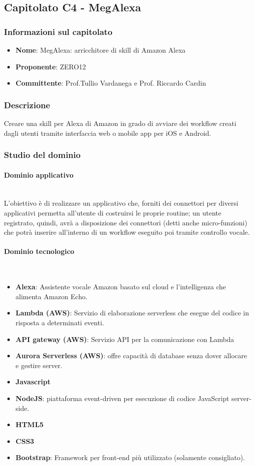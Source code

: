 \subsection{Capitolato C4 - MegAlexa}
\subsubsection{Informazioni sul capitolato}
\begin{itemize}
    \item \textbf{Nome}: MegAlexa: arricchitore di skill di Amazon Alexa
	\item \textbf{Proponente}: ZERO12
	\item \textbf{Committente}: Prof.Tullio Vardanega e Prof. Riccardo Cardin
\end{itemize}
\subsubsection{Descrizione}
Creare una skill per Alexa di Amazon in grado di avviare dei workflow creati
dagli utenti tramite interfaccia web o
mobile app per iOS e Android.

\subsubsection{Studio del dominio}
\paragraph{Dominio applicativo}\mbox{}\\
L'obiettivo è di realizzare un applicativo che, forniti dei connettori per
diversi applicativi permetta all’utente di costruirsi le proprie routine;
un utente registrato, quindi, avrà a disposizione dei connettori (detti anche 
micro-funzioni) che potrà inserire all’interno di un workflow eseguito poi
tramite controllo vocale.
\paragraph{Dominio tecnologico}\mbox{}\\
\begin{itemize}
    \item \textbf{Alexa}: Assistente vocale Amazon basato sul cloud e 
    l'intelligenza che alimenta Amazon Echo.
    \item \textbf{Lambda (AWS)}: Servizio di elaborazione serverless che esegue
    del codice in risposta a determinati eventi.
    \item \textbf{API gateway (AWS)}: Servizio API per la comunicazione con Lambda
    \item \textbf{Aurora Serverless (AWS)}: offre capacità di database senza
    dover allocare e gestire server.
    \item \textbf{Javascript}
    \item \textbf{NodeJS}: piattaforma event-driven per esecuzione di codice
    JavaScript server-side.
    \item \textbf{HTML5}
    \item \textbf{CSS3}
    \item \textbf{Bootstrap}: Framework per front-end più utilizzato (solamente
    consigliato).
\end{itemize}
